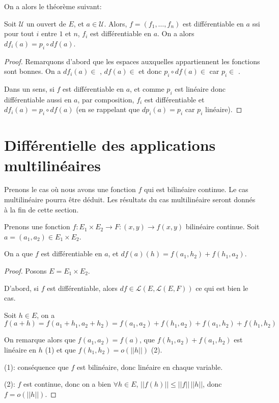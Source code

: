 On a alors le théorème suivant:

\begin{theorem}
\label{differential_composante}
	Soit $\mathcal{U}$ un ouvert de $E$, et $a \in \mathcal{U}$. Alors, 
	$f = (f_{1}, \ldots, f_{n})$ est différentiable en $a$ ssi pour tout $i$
	entre $1$ et $n$, $f_{i}$ est différentiable en $a$. On a alors $df_{i}(a) =
	p_{i} \circ df(a)$.
\end{theorem}

\begin{proof}
	Remarquons d'abord que les espaces auxquelles appartiennent les fonctions
	sont bonnes. On a $df_{i}(a) \in$ , $df(a) \in
	$  et donc $p_{i} \circ df(a) \in $
	 car $p_{i} \in $
	.

	Dans un sens, si $f$ est différentiable en $a$, et comme $p_{i}$ est
	linéaire donc différentiable aussi en $a$, par composition, $f_{i}$ est
	différentiable et $df_{i}(a) = p_{i} \circ df(a)$ (en se rappelant que
	$dp_{i}(a) = p_{i}$ car $p_{i}$ linéaire).
\end{proof}

\section{Différentielle des applications multilinéaires}

Prenons le cas où nous avons une fonction $f$ qui est bilinéaire continue. Le cas
multilinéaire pourra être déduit. Les résultats du cas multilinéaire seront
donnés à la fin de cette section.

\begin{proposition}
\label{bilinear_differential_application}
Prenons une fonction $f : E_{1} \times E_{2} \rightarrow F : (x, y) \rightarrow
f(x, y)$ bilinéaire continue. Soit $a = (a_{1}, a_{2}) \in E_{1} \times E_{2}$.

On a que $f$ est différentiable en $a$, et $df(a)(h) = f(a_{1}, h_{2}) +
f(h_{1}, a_{2})$.
\end{proposition}

\begin{proof}
	Posons $E = E_{1} \times E_{2}$.

	D'abord, si $f$ est différentiable, alors $df \in
	\mathcal{L}(E, \mathcal{L}(E, F))$ ce qui est bien
	le cas.

	Soit $h \in E$, on a
	$f(a + h) = f(a_{1} + h_{1}, a_{2} + h_{2}) = 
	f(a_{1}, a_{2}) + f(h_{1}, a_{2}) + f(a_{1}, h_{2}) + f(h_{1}, h_{2})$

	On remarque alors que $f(a_{1}, a_{2}) = f(a)$, que $f(h_{1}, a_{2}) +
	f(a_{1}, h_{2})$ est linéaire en $h$ (1) et que $f(h_{1}, h_{2}) = o(||h||)$
	(2).

	(1): conséquence que $f$ est bilinéaire, donc linéaire en chaque variable.

	(2): $f$ est continue, donc on a bien $\forall h \in E$, $||f(h)|| \leq
	||f|| \, ||h||$, donc $f = o(||h||)$.
\end{proof}

